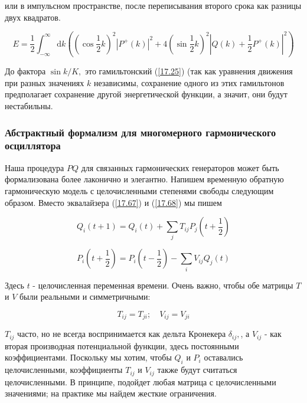 \documentclass[main.tex]{subfiles}
\begin{document}
или в импульсном пространстве, после переписывания второго срока как разницы двух квадратов.

\begin{equation}\label{17.74}
E=\frac{1}{2} \int_{-\infty}^{\infty} \mathrm{d} k\left(\left(\cos \frac{1}{2} k\right)^{2}\left|P^{+}(k)\right|^{2}+4\left(\sin \frac{1}{2} k\right)^{2}\left|Q(k)+\frac{1}{2} P^{+}(k)\right|^{2}\right)
\end{equation}


До фактора $\sin k/K,$ это гамильтонский (\ref{17.25}) (так как уравнения движения при разных значениях $k$ независимы, сохранение одного из этих гамильтонов предполагает сохранение другой энергетической функции, а значит, они будут нестабильны.


\subsubsection{Абстрактный формализм для многомерного гармонического осциллятора}\label{ch17.2.2}

Наша процедура $P Q$ для связанных гармонических генераторов может быть формализована более лаконично и элегантно. Напишем временную обратную гармоническую модель с целочисленными степенями свободы следующим образом. Вместо эквалайзера (\ref{17.67}) и (\ref{17.68}) мы пишем

\begin{equation}\label{17.77}
Q_{i}(t+1)=Q_{i}(t)+\sum_{j} T_{i j} P_{j}\left(t+\frac{1}{2}\right)
\end{equation}

\begin{equation}\label{17.78}
P_{i}\left(t+\frac{1}{2}\right)=P_{i}\left(t-\frac{1}{2}\right)-\sum_{i} V_{i j} Q_{j}(t)
\end{equation}

Здесь $t$ - целочисленная переменная времени. Очень важно, чтобы обе матрицы $T$ и $V$ были реальными и симметричными:

\begin{equation}\label{17.}
T_{i j}=T_{j i} ; \quad V_{i j}=V_{j i}
\end{equation}

$T_{i j}$ часто, но не всегда воспринимается как дельта Кронекера $\delta_{i j},$, а $V_{i j}$ - как вторая производная потенциальной функции, здесь постоянными коэффициентами. Поскольку мы хотим, чтобы $Q_{i}$ и $P_{i}$ оставались целочисленными, коэффициенты $T_{i j}$ и $V_{i j}$ также будут считаться целочисленными. В принципе, подойдет любая матрица с целочисленными значениями; на практике мы найдем жесткие ограничения.
\end{document}
